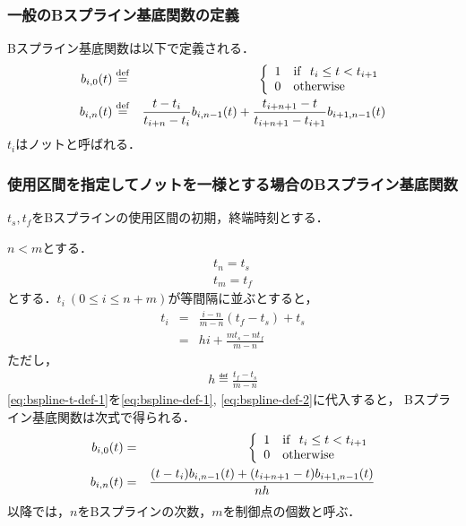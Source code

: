\subsubsection*{一般のBスプライン基底関数の定義}

Bスプライン基底関数は以下で定義される．
\begin{eqnarray}
  b_{i, 0}(t) &\stackrel{\mathrm{def}}{=}& \left\{ \begin{array}{ll} 1 & {\rm if \ \ } t_i \leq t < t_{i+1}\\ 0 & {\rm otherwise}\end{array}\right. \label{eq:bspline-def-1} \\
  b_{i, n}(t) &\stackrel{\mathrm{def}}{=}& \frac{t - t_i}{t_{i+n} - t_i} b_{i, n-1}(t) + \frac{t_{i+n+1} - t}{t_{i+n+1} - t_{i+1}} b_{i+1, n-1}(t) \label{eq:bspline-def-2}
\end{eqnarray}
$t_i$はノットと呼ばれる．

\subsubsection*{使用区間を指定してノットを一様とする場合のBスプライン基底関数}

$t_s, t_f$をBスプラインの使用区間の初期，終端時刻とする．

$n < m$とする．
\begin{eqnarray}
  t_n = t_s \\
  t_m = t_f
\end{eqnarray}
とする．$t_i \ (0 \leq i \leq n+m)$が等間隔に並ぶとすると，
\begin{eqnarray}
  t_i &=& \frac{i - n}{m - n} (t_f - t_s) + t_s \\
  &=& h i + \frac{m t_s - n t_f}{m - n} \label{eq:bspline-t-def-1}
\end{eqnarray}
ただし，
\begin{eqnarray}
  h \eqdef \frac{t_f - t_s}{m - n}
\end{eqnarray}
\eqref{eq:bspline-t-def-1}を\eqref{eq:bspline-def-1}, \eqref{eq:bspline-def-2}に代入すると，
Bスプライン基底関数は次式で得られる．
\begin{eqnarray}
  b_{i, 0}(t) &=& \left\{ \begin{array}{ll} 1 & {\rm if \ \ } t_i \leq t < t_{i+1}\\ 0 & {\rm otherwise}\end{array}\right. \label{eq:bspline-uniform-knot-1} \\
  b_{i, n}(t) &=& \frac{(t - t_i) b_{i, n-1}(t) + (t_{i+n+1} - t) b_{i+1, n-1}(t)}{n h} \label{eq:bspline-uniform-knot-2}
\end{eqnarray}
以降では，$n$をBスプラインの次数，$m$を制御点の個数と呼ぶ．

